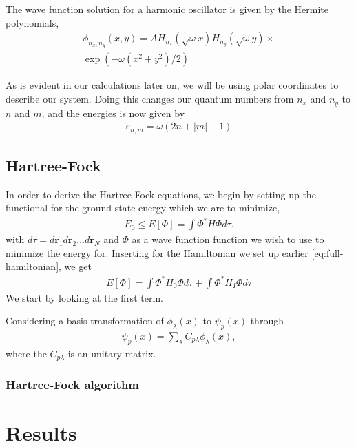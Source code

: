\documentclass[11pt,twocolumn]{article}
\newcommand{\husk}[1]{\color{red} #1 \color{black}}
\begin{document}
The wave function solution for a harmonic oscillator is given by the Hermite polynomials,
\begin{align}
	\phi_{n_x,n_y}(x,y) = AH_{n_x}(\sqrt{\omega}x)H_{n_y}(\sqrt{\omega}y)\times \nonumber \\
	\exp(-\omega(x^2 + y^2)/2)
\end{align}

As is evident in our calculations later on, we will be using polar coordinates to describe our system. Doing this changes our quantum numbers from $n_x$ and $n_y$ to $n$ and $m$, and the energies is now given by
\begin{align}
	\varepsilon_{n, m} = \omega(2n + |m| + 1)
	\label{eq:ho-energy-polar}
\end{align}

\subsection{Hartree-Fock}
In order to derive the Hartree-Fock equations, we begin by setting up the functional for the ground state energy which we are to minimize,
\begin{align}
	E_0 \leq E[\Phi] = \int \Phi^* \hat{H} \Phi d\tau.
	\label{eq:variational-principle}
\end{align}
with $d\tau = d\mathbf{r}_1d\mathbf{r}_2\dots d\mathbf{r}_N$ and $\Phi$ as a wave function function we wish to use to minimize the energy for. Inserting for the Hamiltonian we set up earlier \eqref{eq:full-hamiltonian}, we get
\begin{align}
	E[\Phi] = \int \Phi^* H_0 \Phi d\tau + \int \Phi^* H_I \Phi d\tau
	\label{eq:energy-functional}
\end{align}
We start by looking at the first term.





\husk{Considering} a basis transformation of $\phi_\lambda(x)$ to $\psi_p(x)$ through
\begin{align}
	\psi_p (x) = \sum_\lambda C_{p\lambda} \phi_\lambda(x),
	\label{eq:wavefunc-transform}
\end{align}
where the $C_{p\lambda}$ is an unitary matrix.

\subsubsection{Hartree-Fock algorithm}


\section{Results}
\end{document}
